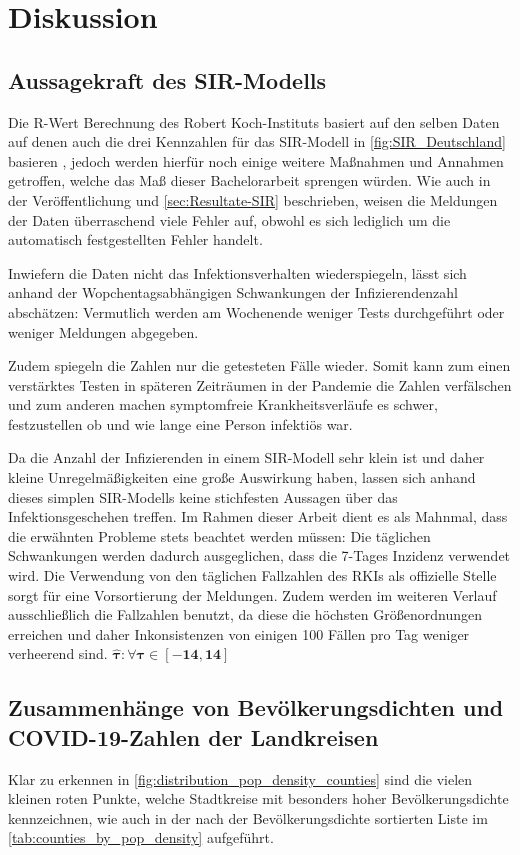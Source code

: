 \chapter{Diskussion}\label{chap:Diskussion}
\section{Aussagekraft des SIR-Modells}
Die R-Wert Berechnung des Robert Koch-Instituts basiert auf den selben Daten auf denen auch die drei Kennzahlen für das SIR-Modell in \autoref{fig:SIR_Deutschland} basieren \autocite{RKI_Bulletin}, jedoch werden hierfür noch einige weitere Maßnahmen und Annahmen getroffen, welche das Maß dieser Bachelorarbeit sprengen würden.\autocite{RKI_Bulletin}
Wie auch in der Veröffentlichung und \autoref{sec:Resultate-SIR} beschrieben, weisen die Meldungen der Daten überraschend viele Fehler auf, obwohl es sich lediglich um die automatisch festgestellten Fehler handelt.

Inwiefern die Daten nicht das Infektionsverhalten wiederspiegeln, lässt sich anhand der Wopchentagsabhängigen Schwankungen der Infizierendenzahl abschätzen: Vermutlich werden am Wochenende weniger Tests durchgeführt oder weniger Meldungen abgegeben. 

Zudem spiegeln die Zahlen nur die getesteten Fälle wieder. Somit kann zum einen verstärktes Testen in späteren Zeiträumen in der Pandemie die Zahlen verfälschen und zum anderen machen symptomfreie Krankheitsverläufe es schwer, festzustellen ob und wie lange eine Person infektiös war.

Da die Anzahl der Infizierenden in einem SIR-Modell sehr klein ist und daher kleine Unregelmäßigkeiten eine große Auswirkung haben, lassen sich anhand dieses simplen SIR-Modells keine stichfesten Aussagen über das Infektionsgeschehen treffen.
Im Rahmen dieser Arbeit dient es als Mahnmal, dass die erwähnten Probleme stets beachtet werden müssen:
Die täglichen Schwankungen werden dadurch ausgeglichen, dass die 7-Tages Inzidenz verwendet wird. Die Verwendung von den täglichen Fallzahlen des RKIs als offizielle Stelle sorgt für eine Vorsortierung der Meldungen. Zudem werden im weiteren Verlauf ausschließlich die Fallzahlen benutzt, da diese die höchsten Größenordnungen erreichen und daher Inkonsistenzen von einigen 100 Fällen pro Tag weniger verheerend sind.
$\boldsymbol{\hat{\tau}:\forall\tau\in[-14, 14]}$

\section{Zusammenhänge von Bevölkerungsdichten und COVID-19-Zahlen der Landkreisen}\label{sec:discussion:pop_density_counties}
Klar zu erkennen in \autoref{fig:distribution_pop_density_counties} sind die vielen kleinen roten Punkte, welche Stadtkreise mit besonders hoher Bevölkerungsdichte kennzeichnen, wie auch in der nach der Bevölkerungsdichte sortierten Liste im \autoref{tab:counties_by_pop_density} aufgeführt.

